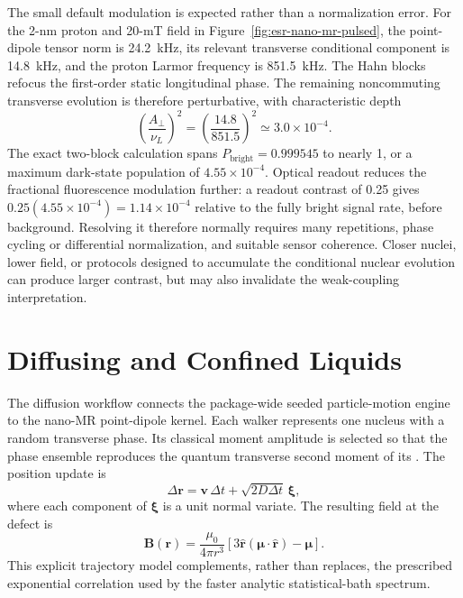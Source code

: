 The small default modulation is expected rather than a normalization error.
For the 2-nm proton and 20-mT field in
Figure~\ref{fig:esr-nano-mr-pulsed}, the point-dipole tensor norm is
24.2~kHz, its relevant transverse conditional component is 14.8~kHz, and the
proton Larmor frequency is 851.5~kHz. The Hahn blocks refocus the first-order
static longitudinal phase. The remaining noncommuting transverse evolution is
therefore perturbative, with characteristic depth
\[
  \left(\frac{A_\perp}{\nu_L}\right)^2
  =\left(\frac{14.8}{851.5}\right)^2
  \simeq 3.0\times10^{-4}.
\]
The exact two-block calculation spans
\(P_\mathrm{bright}=0.999545\) to nearly 1, or a maximum dark-state
population of \(4.55\times10^{-4}\). Optical readout reduces the fractional
fluorescence modulation further: a readout contrast of 0.25 gives
\(0.25(4.55\times10^{-4})=1.14\times10^{-4}\) relative to the fully bright
signal rate, before background. Resolving it therefore normally requires many
repetitions, phase cycling or differential normalization, and suitable sensor
coherence. Closer nuclei, lower field, or protocols designed to accumulate
the conditional nuclear evolution can produce larger contrast, but may also
invalidate the weak-coupling interpretation.

\section{Diffusing and Confined Liquids}

The diffusion workflow connects the package-wide seeded particle-motion engine to the
nano-MR point-dipole kernel. Each walker represents one nucleus with a random
transverse phase. Its classical moment amplitude is selected so that the phase
ensemble reproduces the quantum transverse second moment of its
. The position update is
\[
  \Delta\mathbf r
  =\mathbf v\,\Delta t
  +\sqrt{2D\Delta t}\,\boldsymbol{\xi},
\]
where each component of \(\boldsymbol{\xi}\) is a unit normal variate. The
resulting field at the defect is
\[
  \mathbf B(\mathbf r)
  =\frac{\mu_0}{4\pi r^3}
   \left[
     3\hat{\mathbf r}
       (\boldsymbol{\mu}\mathbin{\cdot}\hat{\mathbf r})
     -\boldsymbol{\mu}
   \right].
\]
This explicit trajectory model complements, rather than replaces, the
prescribed exponential correlation used by the faster analytic statistical-bath
spectrum.

